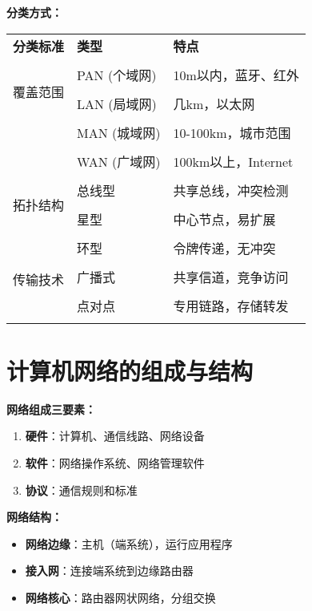 \documentclass[lang=cn,newtx,10pt,scheme=chinese]{../../elegantbook}
\begin{document}
\textbf{分类方式：}
\begin{longtable}{@{}llp{6cm}@{}}
\toprule
\textbf{分类标准} & \textbf{类型} & \textbf{特点} \\\\ \midrule
\endhead

\multirow{4}{*}{覆盖范围} & PAN (个域网) & 10m以内，蓝牙、红外 \\\\
& LAN (局域网) & 几km，以太网 \\\\
& MAN (城域网) & 10-100km，城市范围 \\\\
& WAN (广域网) & 100km以上，Internet \\\\
\hline

\multirow{3}{*}{拓扑结构} & 总线型 & 共享总线，冲突检测 \\\\
& 星型 & 中心节点，易扩展 \\\\
& 环型 & 令牌传递，无冲突 \\\\
\hline

\multirow{2}{*}{传输技术} & 广播式 & 共享信道，竞争访问 \\\\
& 点对点 & 专用链路，存储转发 \\\\

\bottomrule
\end{longtable}

\section{计算机网络的组成与结构}

\textbf{网络组成三要素：}
\begin{enumerate}
  \item \textbf{硬件}：计算机、通信线路、网络设备
  \item \textbf{软件}：网络操作系统、网络管理软件
  \item \textbf{协议}：通信规则和标准
\end{enumerate}

\textbf{网络结构：}
\begin{itemize}
  \item \textbf{网络边缘}：主机（端系统），运行应用程序
  \item \textbf{接入网}：连接端系统到边缘路由器
  \item \textbf{网络核心}：路由器网状网络，分组交换
\end{itemize}
\end{document}

